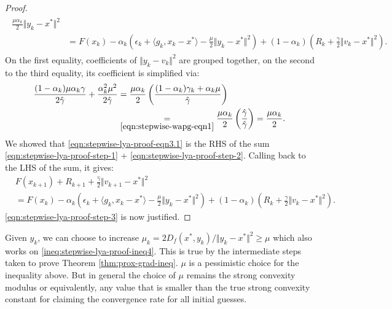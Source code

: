 \documentclass[12pt]{article}
\begin{document}
\begin{proof}
\begin{align}
\begin{split}
                \frac{\mu\alpha_k}{2} \Vert y_k - x^*\Vert^2
            \\&=
            F(x_k) - \alpha_k\left(
                \epsilon_k + \langle g_k, x_k - x^*\rangle
                - \frac{\mu}{2}\Vert y_k - x^*\Vert^2
            \right)
            +
            (1 - \alpha_k)\left(
                R_k + \frac{\gamma}{2}\Vert v_k - x^*\Vert^2
            \right).
        \end{split} %
        \end{align}
        On the first equality, coefficients of $\Vert y_k - v_k\Vert^2$ are grouped together, on the second to the third equality, its coefficient is simplified via:
        \begin{align*}
            \frac{(1 - \alpha_k)\mu\alpha_k\gamma}{2\hat \gamma} +
            \frac{\alpha_k^2 \mu^2}{2\hat \gamma}
            &=
            \frac{\mu\alpha_k}{2}\left(
                \frac{(1 - \alpha_k)\gamma_k + \alpha_k \mu}{\hat \gamma}
            \right)
            \\
            &\underset{\eqref{eqn:stepwise-wapg-eqn1}}{=} \frac{\mu\alpha_k}{2}\left(
                \frac{\hat \gamma}{\hat \gamma}
            \right) = \frac{\mu\alpha_k}{2}.
        \end{align*}
        We showed that \eqref{eqn:stepwise-lya-proof-eqn3.1} is the RHS of the sum \eqref{eqn:stepwise-lya-proof-step-1} + \eqref{eqn:stepwise-lya-proof-step-2}.
        Calling back to the LHS of the sum, it gives:
        \begin{align*}
            & F(x_{k + 1}) + R_{k + 1} +
            \frac{\hat \gamma}{2}\Vert v_{k + 1} - x^*\Vert^2
            \\
            &=
            F(x_k) - \alpha_k\left(
                \epsilon_k + \langle g_k, x_k - x^*\rangle
                - \frac{\mu}{2}\Vert y_k - x^*\Vert^2
            \right)
            +
            (1 - \alpha_k)\left(
                R_k + \frac{\gamma}{2}\Vert v_k - x^*\Vert^2
            \right).
        \end{align*}
        \eqref{eqn:stepwise-lya-proof-step-3} is now justified.

    \end{proof}
    \begin{remark}
        Given $y_k$, we can choose to increase $\mu_k = 2D_f(x^*, y_k)/\Vert y_k - x^*\Vert^2 \ge \mu$ which also works on \eqref{ineq:stepwise-lya-proof-ineq4}.
        This is true by the intermediate steps taken to prove Theorem \ref{thm:prox-grad-ineq}.
        $\mu$ is a pessimistic choice for the inequality above.
        But in general the choice of $\mu$ remains the strong convexity modulus or equivalently, any value that is smaller than the true strong convexity constant for claiming the convergence rate for all initial guesses.
    \end{remark}
\end{document}
